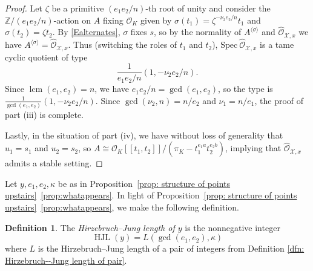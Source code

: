 \documentclass[12pt]{amsart}
\numberwithin{equation}{section}
\newtheorem{corollary}[equation]{Corollary}
\theoremstyle{definition}
\newtheorem{defn}[equation]{Definition}
\newcommand{\mc}[1]{\mathcal{#1}}
\newcommand{\ints}{\mathbb Z}
\newcommand{\proj}{\mathbb P}
\newcommand{\Spec}{\mathrm{Spec} \ }
\newcommand{\X}{\mathcal{X}}
\DeclareMathOperator{\lcm}{lcm}
\DeclareMathOperator{\HJL}{HJL}
\begin{document}
\begin{proof}
Let $\zeta$ be a primitive
$(e_1e_2/n)$-th root of unity and consider the $\ints/(e_1e_2/n)$-action on $A$ fixing $\mc{O}_K$ given by
$\sigma(t_1) = \zeta^{-\nu_2e_2/n}t_1$ and $\sigma(t_2) = \zeta t_2$.
By \eqref{Ealternates}, $\sigma$ fixes $s$, so by the normality of
$A^{\langle \sigma \rangle}$ and $\hat{\mc{O}}_{\mc{X}, x}$ we have
$A^{\langle \sigma \rangle} = \hat{\mc{O}}_{\mc{X}, x}$.  Thus
(switching the roles of $t_1$ and $t_2$), 
$\Spec \hat{\mc{O}}_{\X, x}$ is a tame cyclic quotient of type
$$\frac{1}{e_1e_2/n}(1, - \nu_2e_2/n).$$ Since $\lcm(e_1, e_2) = n$, we
have $e_1e_2/n = \gcd(e_1, e_2)$, so the type is $\frac{1}{\gcd(e_1,e_2)}(1, - \nu_2e_2/n)$.  Since
$\gcd(\nu_2,n) = n/e_2$ and $\nu_1 = n/e_1$, the proof of part (iii)
is complete.

Lastly, in the situation of part (iv), we have without loss of
generality that $u_1 = s_1$ and $u_2 = s_2$, so $A \cong
\mc{O}_K[[t_1,t_2]]/(\pi_K - t_1^{e_1a}t_2^{e_2b})$, implying
that $\hat{\mc{O}}_{\mc{X},x}$ admits a stable setting.
\end{proof}
  

Let $y,e_1,e_2,\kappa$ be as in Proposition~\ref{prop: structure of points upstairs}~\ref{prop:whatappears}. In light of Proposition~\ref{prop: structure of points upstairs}~\ref{prop:whatappears},
we make the following definition. 
\begin{defn}\label{dfn: Hirzebruch--Jung length of point}
    The \textit{Hirzebruch--Jung length of $y$} is the nonnegative integer
    \[\HJL(y)=L(\gcd(e_1,e_2),\kappa)\] where $L$ is the
    Hirzebruch--Jung length of a pair of integers from Definition
    \ref{dfn: Hirzebruch--Jung length of pair}.  
\end{defn}
\end{document}
